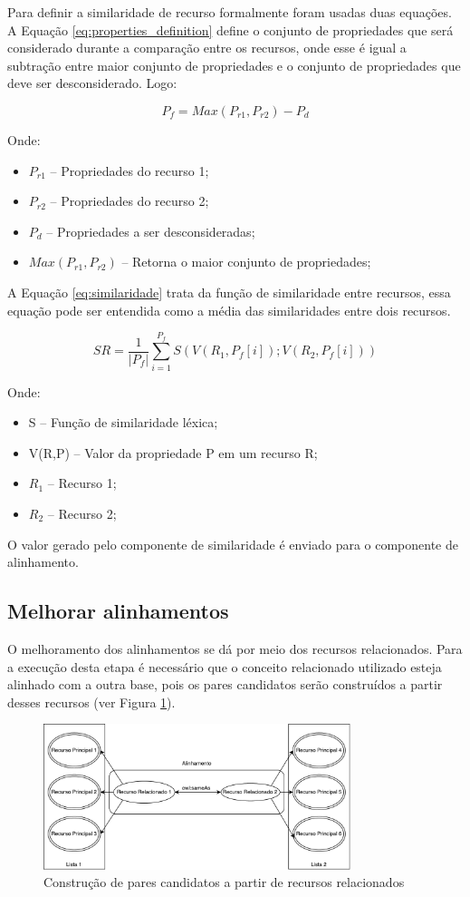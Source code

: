 Para definir a similaridade de recurso formalmente foram usadas duas equações. A Equação \ref{eq:properties_definition} define o conjunto de propriedades que será considerado durante a comparação entre os recursos, onde esse é igual a subtração entre maior conjunto de propriedades e o conjunto de propriedades que deve ser desconsiderado. Logo:

\begin{equation}
P_f =M a x  ( P_{r1} ,P_{r2} ) - P_d
\label{eq:properties_definition}
\end{equation}

Onde:
\begin{itemize}
	\item $P_{r1}$ – Propriedades do recurso 1;
	\item $P_{r2}$ –  Propriedades do recurso 2;
	\item $P_d$ –  Propriedades a ser desconsideradas;
	\item $M a x  ( P_{r1} ,P_{r2} )$ – Retorna o maior conjunto de propriedades;
\end{itemize}

A Equação \ref{eq:similaridade} trata da função de similaridade entre recursos, essa equação pode ser entendida como a média das similaridades entre dois recursos.

\begin{equation}
SR  = \frac{1}{|P_f|} { \sum_{i = 1}^{P_f} {S(V(R_1,P_f[i]);V(R_2,P_f[i]))}}
\label{eq:similaridade}
\end{equation}

Onde:

\begin{itemize}
	\item S – Função de similaridade léxica;
	\item V(R,P) – Valor da propriedade P em um recurso R;
	\item $R_1$ – Recurso 1;
	\item $R_2$ – Recurso 2;
\end{itemize}

O valor gerado pelo componente de similaridade é enviado para o componente de alinhamento.

\subsection{Melhorar alinhamentos}
O melhoramento dos alinhamentos se dá por meio dos recursos relacionados. Para a execução desta etapa é necessário que o conceito relacionado utilizado esteja alinhado com a outra base, pois os pares candidatos serão construídos a partir desses recursos (ver Figura \ref{fig:relacionados}).

\begin{figure}[!ht]
	\centering
	\includegraphics[width=0.8\textwidth]{./imagens/relacionados.pdf}
    \caption{Construção de pares candidatos a partir de recursos relacionados}
	\label{fig:relacionados}
\end{figure}
